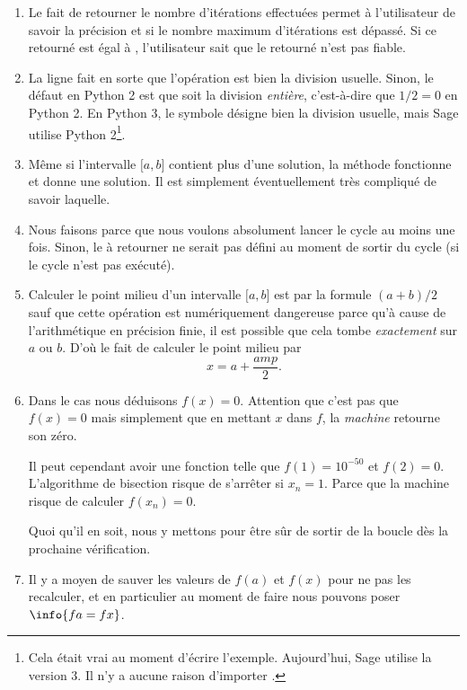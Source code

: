 \begin{enumerate}
	\item
	      Le fait de retourner le nombre d'itérations effectuées permet à l'utilisateur de savoir la précision et si le nombre maximum d'itérations est dépassé. Si ce  retourné est égal à , l'utilisateur sait que le  retourné n'est pas fiable.
	\item
	      La ligne  fait en sorte que l'opération \info{/} est bien la division usuelle. Sinon, le défaut en Python 2 est que \info{/} soit la division \emph{entière}, c'est-à-dire que \( 1/2=0\) en Python 2.
	      En Python 3, le symbole \info{/} désigne bien la division usuelle, mais Sage utilise Python 2\footnote{Cela était vrai au moment d'écrire l'exemple. Aujourd'hui, Sage utilise la version 3. Il n'y a aucune raison d'importer .}.
	\item
	      Même si l'intervalle \( \mathopen[ a , b \mathclose]\) contient plus d'une solution, la méthode fonctionne et donne une solution. Il est simplement éventuellement très compliqué de savoir laquelle.
	\item
	      Nous faisons  parce que nous voulons absolument lancer le cycle au moins une fois. Sinon, le  à retourner ne serait pas défini au moment de sortir du cycle (si le cycle n'est pas exécuté).
	\item
	      Calculer le point milieu d'un intervalle \( \mathopen[ a , b \mathclose]\) est par la formule \( (a+b)/2\) sauf que cette opération est numériquement dangereuse parce qu'à cause de l'arithmétique en précision finie, il est possible que cela tombe \emph{exactement} sur \( a\) ou \( b\). D'où le fait de calculer le point milieu par
	      \begin{equation}
		      x=a+\frac{ amp }{2}.
	      \end{equation}
	\item
	      Dans le cas  nous déduisons \( f(x)=0\). Attention que c'est pas que \( f(x)=0\) mais simplement que en mettant \( x\) dans \( f\), la \emph{machine} retourne son zéro.

	      Il peut cependant avoir une fonction telle que \( f(1)=10^{-50}\) et \( f(2)=0\). L'algorithme de bisection risque de s'arrêter si \( x_n=1\). Parce que la machine risque de calculer \( f(x_n)=0\).

	      Quoi qu'il en soit, nous y mettons  pour être sûr de sortir de la boucle dès la prochaine vérification.
	\item
	      Il y a moyen de sauver les valeurs de \( f(a)\) et \( f(x)\) pour ne pas les recalculer, et en particulier au moment de faire  nous pouvons poser \(\info{fa=fx}\).
\end{enumerate}

